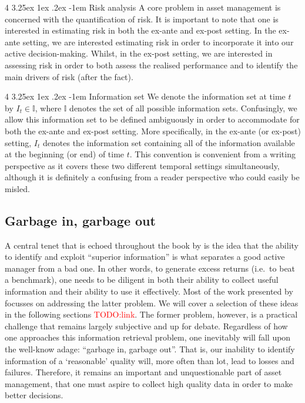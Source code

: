 \documentclass[12pt]{article}
\makeatletter
\renewcommand\paragraph{%
	\@startsection{paragraph}
	{4}
	{\z@}
	{3.25ex \@plus1ex \@minus.2ex}
	{-1em}
	{\normalfont\normalsize\bfseries\maybe@addperiod}%
}
\newcommand{\maybe@addperiod}[1]{%
	#1\@addpunct{.}%
}
\makeatother
\begin{document}
\paragraph{Risk analysis} A core problem in asset management is concerned with the quantification of risk. It is important to note that one is interested in estimating risk in both the ex-ante and ex-post setting. In the ex-ante setting, we are interested estimating risk in order to incorporate it into our active decision-making. Whilst, in the ex-post setting, we are interested in assessing risk in order to both assess the realised performance and to identify the main drivers of risk (after the fact).

\paragraph{Information set} We denote the information set at time $t$ by $I_t \in \mathbb{I}$, where $\mathbb{I}$ denotes the set of all possible information sets. Confusingly, we allow this information set to be defined ambiguously in order to accommodate for both the ex-ante and ex-post setting. More specifically, in the ex-ante (or ex-post) setting, $I_t$ denotes the information set containing all of the information available at the beginning (or end) of time $t$. This convention is convenient from a writing perspective as it covers these two different temporal settings simultaneously, although it is definitely a confusing from a reader perspective who could easily be misled.
\subsection{Garbage in, garbage out}
A central tenet that is echoed throughout the book by \cite{grinold1999} is  the idea that the ability to identify and exploit ``superior information'' is what separates a good active manager from a bad one. In other words, to generate excess returns (i.e.\ to beat a benchmark), one needs to be diligent in both their ability to collect useful information and their ability to use it effectively. Most of the work presented by \cite{grinold1999} focusses on addressing the latter problem. We will cover a selection of these ideas in the following sections \textcolor{red}{TODO:link}. The former problem, however, is a practical challenge that remains largely subjective and up for debate. Regardless of how one approaches this information retrieval problem, one inevitably will fall upon the well-know adage: ``garbage in, garbage out''. That is, our inability to identify information of a `reasonable' quality will, more often than lot, lead to losses and failures. Therefore, it remains an important and unquestionable part of asset management, that one must aspire to collect high quality data in order to make better decisions.
\end{document}
